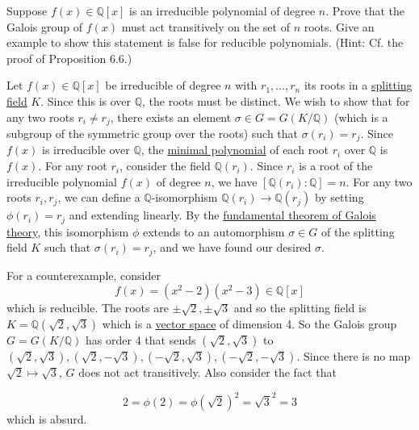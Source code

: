   \begin{exercise}[Shifrin 7.6.14]
    Suppose $f(x) \in \mathbb{Q}[x]$ is an irreducible polynomial of degree $n$. Prove that the Galois group of $f(x)$ must act transitively on the set of $n$ roots. Give an example to show this statement is false for reducible polynomials. (Hint: Cf. the proof of Proposition 6.6.)
  \end{exercise}
  \begin{solution}
    Let $f(x) \in \mathbb{Q}[x]$ be irreducible of degree $n$ with $r_1, \ldots, r_n$ its roots in a \hyperref[def:splitting-field]{splitting field} $K$. Since this is over $\mathbb{Q}$, the roots must be distinct. We wish to show that for any two roots $r_i \neq r_j$, there exists an element $\sigma \in G = G(K/\mathbb{Q})$ (which is a subgroup of the symmetric group over the roots) such that $\sigma(r_i) = r_j$. Since $f(x)$ is irreducible over $\mathbb{Q}$, the \hyperref[def:min_poly]{minimal polynomial} of each root $r_i$ over $\mathbb{Q}$ is $f(x)$. For any root $r_i$, consider the field $\mathbb{Q}(r_i)$. Since $r_i$ is a root of the irreducible polynomial $f(x)$ of degree $n$, we have $[\mathbb{Q}(r_i): \mathbb{Q}] = n$. For any two roots $r_i, r_j$, we can define a $\mathbb{Q}$-isomorphism $\mathbb{Q}(r_i) \to \mathbb{Q}(r_j)$ by setting $\phi(r_i) = r_j$ and extending linearly. By the \hyperref[thm:fundamental-theorem-of-galois-theory]{fundamental theorem of Galois theory}, this isomorphism $\phi$ extends to an automorphism $\sigma \in G$ of the splitting field $K$ such that $\sigma(r_i) = r_j$, and we have found our desired $\sigma$. 

    For a counterexample, consider 
    \begin{equation}
      f(x) = (x^2 - 2) (x^2 - 3) \in \mathbb{Q}[x]
    \end{equation}
    which is reducible. The roots are $\pm \sqrt{2}, \pm \sqrt{3}$ and so the splitting field is $K = \mathbb{Q}(\sqrt{2}, \sqrt{3})$ which is a \hyperref[def:vector-space]{vector space} of dimension 4. So the Galois group $G = G(K/\mathbb{Q})$ has order 4 that sends $(\sqrt{2}, \sqrt{3})$ to $(\sqrt{2}, \sqrt{3}), (\sqrt{2}, -\sqrt{3}), (-\sqrt{2}, \sqrt{3}), (-\sqrt{2}, -\sqrt{3})$. Since there is no map $\sqrt{2} \mapsto \sqrt{3}$, $G$ does not act transitively. Also consider the fact that 

    \begin{equation}
      2 = \phi(2) = \phi(\sqrt{2})^2 = \sqrt{3}^2 = 3 
    \end{equation}
    which is absurd. 
  \end{solution}

